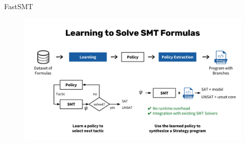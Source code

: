 \documentclass[14pt,aspectratio=169,hyperref={pdftex,unicode},xcolor=dvipsnames]{beamer}
\begin{document}
\begin{frame}[noframenumbering]{FastSMT \cite{fastsmt-paper}}

\begin{figure}[ht]
\begin{center}
  \includegraphics[scale=0.5]{./assets/fastsmt-architecture.pdf}
\end{center}
\end{figure}

\end{frame}
\end{document}
